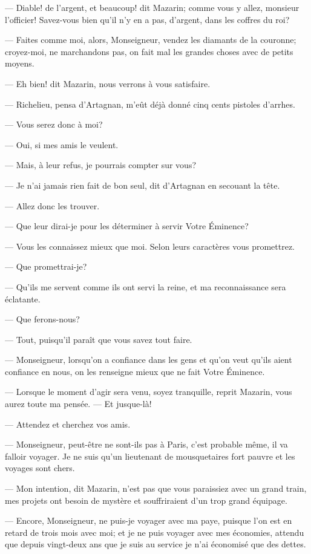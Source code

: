 — Diable! de l'argent, et beaucoup! dit Mazarin; comme vous y allez, monsieur l'officier! Savez-vous bien qu'il n'y en a pas, d'argent, dans les coffres du roi?

— Faites comme moi, alors, Monseigneur, vendez les diamants de la couronne; croyez-moi, ne marchandons pas, on fait mal les grandes choses avec de petits moyens.

— Eh bien! dit Mazarin, nous verrons à vous satisfaire.

— Richelieu, pensa d'Artagnan, m'eût déjà donné cinq cents pistoles d'arrhes.

— Vous serez donc à moi?

— Oui, si mes amis le veulent.

— Mais, à leur refus, je pourrais compter sur vous?

— Je n'ai jamais rien fait de bon seul, dit d'Artagnan en secouant la tête.

— Allez donc les trouver.

— Que leur dirai-je pour les déterminer à servir Votre Éminence?

— Vous les connaissez mieux que moi. Selon leurs caractères vous promettrez.

— Que promettrai-je?

— Qu'ils me servent comme ils ont servi la reine, et ma reconnaissance sera éclatante.

— Que ferons-nous?

— Tout, puisqu'il paraît que vous savez tout faire.

— Monseigneur, lorsqu'on a confiance dans les gens et qu'on veut qu'ils aient confiance en nous, on les renseigne mieux que ne fait Votre Éminence.

— Lorsque le moment d'agir sera venu, soyez tranquille, reprit Mazarin, vous aurez toute ma pensée.
— Et jusque-là!

— Attendez et cherchez vos amis.

— Monseigneur, peut-être ne sont-ils pas à Paris, c'est probable même, il va falloir voyager. Je ne suis qu'un lieutenant de mousquetaires fort pauvre et les voyages sont chers.

— Mon intention, dit Mazarin, n'est pas que vous paraissiez avec un grand train, mes projets ont besoin de mystère et souffriraient d'un trop grand équipage.

— Encore, Monseigneur, ne puis-je voyager avec ma paye, puisque l'on est en retard de trois mois avec moi; et je ne puis voyager avec mes économies, attendu que depuis vingt-deux ans que je suis au service je n'ai économisé que des dettes.

